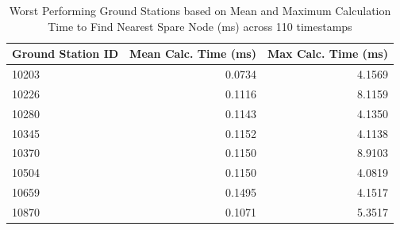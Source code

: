 \begin{table}[htbp]
\centering
\caption{Worst Performing Ground Stations based on Mean and Maximum Calculation Time to Find Nearest Spare Node (ms) across 110 timestamps}
\label{tab:gs_timing_worst_performers}
\begin{tabular}{lrr}
\toprule
Ground Station ID & Mean Calc. Time (ms) & Max Calc. Time (ms) \\
\midrule
10203 & 0.0734 & 4.1569 \\
10226 & 0.1116 & 8.1159 \\
10280 & 0.1143 & 4.1350 \\
10345 & 0.1152 & 4.1138 \\
10370 & 0.1150 & 8.9103 \\
10504 & 0.1150 & 4.0819 \\
10659 & 0.1495 & 4.1517 \\
10870 & 0.1071 & 5.3517 \\
\bottomrule
\end{tabular}
\end{table}
